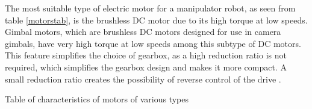 The most suitable type of electric motor for a manipulator robot, as seen from table \ref{motorstab}, is the brushless DC motor due to its high torque at low speeds. Gimbal motors, which are brushless DC motors designed for use in camera gimbals, have very high torque at low speeds among this subtype of DC motors. This feature simplifies the choice of gearbox, as a high reduction ratio is not required, which simplifies the gearbox design and makes it more compact. A small reduction ratio creates the possibility of reverse control of the drive \citep{8867893}.

\begin{table}[H]
	\centering
	\caption{Table of characteristics of motors of various types}\label{motorstab}
	\begin{adjustbox}{width={\textwidth}}


\end{adjustbox}
\end{table}
